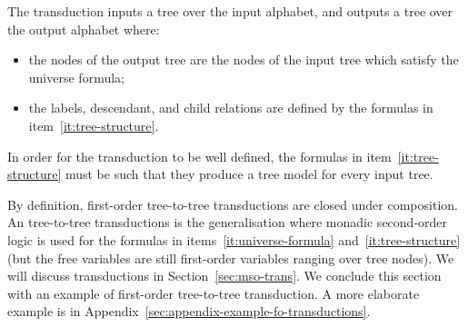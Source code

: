 \begin{definition}
\begin{enumerate}
    The transduction inputs a tree over the input alphabet, and outputs a tree over the output alphabet where:
    \begin{itemize}
        \item the nodes of the output tree are the nodes of the input tree which satisfy the universe formula;
        \item the labels, descendant, and child relations are defined by the formulas in item~\ref{it:tree-structure}.
    \end{itemize}
    In order for the transduction to be well defined, the formulas in item~\ref{it:tree-structure} must be such that they produce a tree model for every input tree.
 \end{enumerate}
\end{definition}

By definition, first-order tree-to-tree transductions are closed under composition. An \mso tree-to-tree transductions is the generalisation where monadic second-order logic \mso is used for the formulas in items~\ref{it:universe-formula} and~\ref {it:tree-structure} (but the free variables are still first-order variables ranging over tree nodes). We will discuss \mso transductions in  Section~\ref{sec:mso-trans}.  We conclude this section with an example of first-order tree-to-tree transduction. A more elaborate example is in Appendix~\ref{sec:appendix-example-fo-transductions}.

